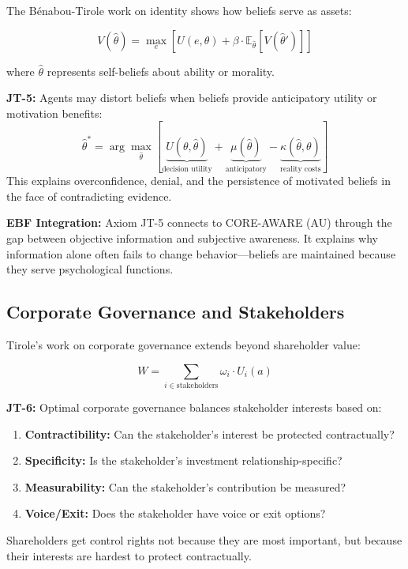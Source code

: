 The Bénabou-Tirole work on identity \citep{tirole_benabou_2011_identity, tirole_benabou_2016_mindful_economics} shows how beliefs serve as assets:

\begin{equation}
V(\hat{\theta}) = \max_e \left[ U(e, \theta) + \beta \cdot \mathbb{E}_{\hat{\theta}}[V(\hat{\theta}')] \right]
\label{eq:jt-identity}
\end{equation}

where $\hat{\theta}$ represents self-beliefs about ability or morality.

\begin{axiom}
\label{ax:jt-5}
\textbf{JT-5:} Agents may distort beliefs when beliefs provide anticipatory utility or motivation benefits:
\begin{equation}
\hat{\theta}^* = \arg\max_{\hat{\theta}} \left[ \underbrace{U(\theta, \hat{\theta})}_{\text{decision utility}} + \underbrace{\mu(\hat{\theta})}_{\text{anticipatory}} - \underbrace{\kappa(\hat{\theta}, \theta)}_{\text{reality costs}} \right]
\end{equation}
This explains overconfidence, denial, and the persistence of motivated beliefs in the face of contradicting evidence.
\end{axiom}

\textbf{EBF Integration:} Axiom JT-5 connects to CORE-AWARE (AU) through the gap between objective information and subjective awareness. It explains why information alone often fails to change behavior---beliefs are maintained because they serve psychological functions.

\subsection{Corporate Governance and Stakeholders}
\label{subsec:jt-governance}

Tirole's work on corporate governance \citep{PAP-tirole_2001_corporate_governance} extends beyond shareholder value:

\begin{equation}
W = \sum_{i \in \text{stakeholders}} \omega_i \cdot U_i(a)
\label{eq:jt-governance}
\end{equation}

\begin{axiom}
\label{ax:jt-6}
\textbf{JT-6:} Optimal corporate governance balances stakeholder interests based on:
\begin{enumerate}
    \item \textbf{Contractibility:} Can the stakeholder's interest be protected contractually?
    \item \textbf{Specificity:} Is the stakeholder's investment relationship-specific?
    \item \textbf{Measurability:} Can the stakeholder's contribution be measured?
    \item \textbf{Voice/Exit:} Does the stakeholder have voice or exit options?
\end{enumerate}
Shareholders get control rights not because they are most important, but because their interests are hardest to protect contractually.
\end{axiom}

